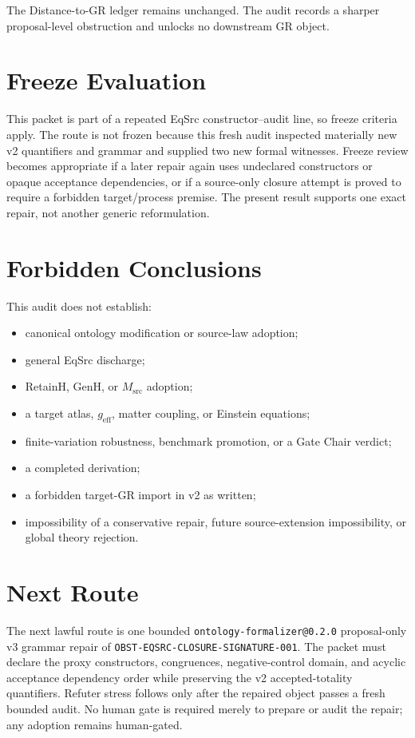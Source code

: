 \documentclass[11pt]{article}
\begin{document}
The Distance-to-GR ledger remains unchanged. The audit records a sharper
proposal-level obstruction and unlocks no downstream GR object.

\section{Freeze Evaluation}

This packet is part of a repeated EqSrc constructor--audit line, so freeze
criteria apply. The route is not frozen because this fresh audit inspected
materially new v2 quantifiers and grammar and supplied two new formal
witnesses. Freeze review becomes appropriate if a later repair again uses
undeclared constructors or opaque acceptance dependencies, or if a source-only
closure attempt is proved to require a forbidden target/process premise. The
present result supports one exact repair, not another generic reformulation.

\section{Forbidden Conclusions}

This audit does not establish:
\begin{itemize}[leftmargin=*]
  \item canonical ontology modification or source-law adoption;
  \item general EqSrc discharge;
  \item RetainH, GenH, or \(M_{\mathrm{src}}\) adoption;
  \item a target atlas, \(g_{\mathrm{eff}}\), matter coupling, or Einstein
  equations;
  \item finite-variation robustness, benchmark promotion, or a Gate Chair
  verdict;
  \item a completed derivation;
  \item a forbidden target-GR import in v2 as written;
  \item impossibility of a conservative repair, future source-extension
  impossibility, or global theory rejection.
\end{itemize}

\section{Next Route}

The next lawful route is one bounded
\texttt{ontology-formalizer@0.2.0} proposal-only v3 grammar repair of
\texttt{OBST-EQSRC-CLOSURE-SIGNATURE-001}. The packet must declare the proxy
constructors, congruences, negative-control domain, and acyclic acceptance
dependency order while preserving the v2 accepted-totality quantifiers.
Refuter stress follows only after the repaired object passes a fresh bounded
audit. No human gate is required merely to prepare or audit the repair; any
adoption remains human-gated.
\end{document}
